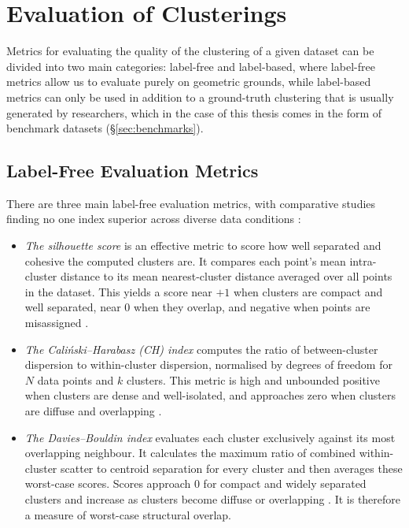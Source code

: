 \documentclass[11pt,a4paper,oneside]{report}
\begin{document}
\section{Evaluation of Clusterings}\label{sec:evaluation}

Metrics for evaluating the quality of the clustering of a given dataset can be divided into two main categories: label-free and label-based, where label-free metrics allow us to evaluate purely on geometric grounds, while label-based metrics can only be used in addition to a ground-truth clustering that is usually generated by researchers, which in the case of this thesis comes in the form of benchmark datasets (\S\ref{sec:benchmarks}).

\subsection{Label-Free Evaluation Metrics}\label{sec:labelfree}

There are three main label-free evaluation metrics, with comparative studies finding no one index superior across diverse data conditions \citep{arbelaitz2013extensive}:
\begin{itemize}
\item \emph{The silhouette score} is an effective metric to score how well separated and cohesive the computed clusters are. It compares each point's mean intra-cluster distance to its mean nearest-cluster distance averaged over all points in the dataset. This yields a score near $+1$ when clusters are compact and well separated, near $0$ when they overlap, and negative when points are misassigned \citep{rousseeuw1987silhouettes}.
\item \emph{The Cali\'nski--Harabasz (CH) index} computes the ratio of between-cluster dispersion to within-cluster dispersion, normalised by degrees of freedom for $N$ data points and $k$ clusters. This metric is high and unbounded positive when clusters are dense and well-isolated, and approaches zero when clusters are diffuse and overlapping \citep{calinski1974dendrite}.
\item \emph{The Davies--Bouldin index} evaluates each cluster exclusively against its most overlapping neighbour. It calculates the maximum ratio of combined within-cluster scatter to centroid separation for every cluster and then averages these worst-case scores. Scores approach 0 for compact and widely separated clusters and increase as clusters become diffuse or overlapping \citep{davies1979cluster}. It is therefore a measure of worst-case structural overlap.
\end{itemize}
\end{document}
